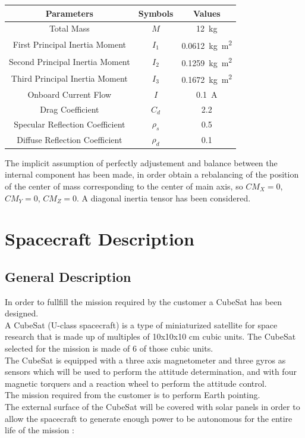 \documentclass[11pt,a4paper]{report}
\begin{document}
\begin{table}[H]
	\centering
	\begin{tabular}{|c|c|c|}
		\hline
		Parameters & Symbols & Values \\
		\hline
		Total Mass & $M$ & \SI{12}{\kilo\gram}\\
        \hline
		First Principal Inertia Moment & $I_1$ & \SI{0.0612}{\kilo\gram\meter^2}\\
		\hline		
		Second Principal Inertia Moment & $I_2$ & \SI{0.1259}{\kilo\gram\meter^2}\\
		\hline
		Third Principal Inertia Moment & $I_3$ & \SI{0.1672}{\kilo\gram\meter^2}\\
		\hline
		Onboard Current Flow & $I$ & \SI{0.1}{\ampere}\\
		\hline
		Drag Coefficient & $C_d$ & 2.2 \\
		\hline
		Specular Reflection Coefficient & $\rho_{s}$ & 0.5 \\
		\hline
		Diffuse Reflection Coefficient & $\rho_{d}$ & 0.1 \\
		\hline
	\end{tabular}
\end{table}

The implicit assumption of perfectly adjustement and balance between the internal component has been made, in order obtain a rebalancing of the position of the center of mass corresponding to the center of main axis, so $CM_{X} = 0$, $CM_{Y} = 0$, $CM_{Z} = 0$.
A diagonal inertia tensor has been considered.\\

\chapter{Spacecraft Description}

\section{General Description}
In order to fullfill the mission required by the customer a CubeSat has been designed. \\
A CubeSat (U-class spacecraft) is a type of miniaturized satellite for space research that is made up of multiples of 10x10x10 cm cubic units. The CubeSat selected for the mission is made of 6 of those cubic units. \\
The CubeSat is equipped with a three axis magnetometer and three gyros as sensors which will be used to perform the attitude determination, and with four magnetic torquers and a reaction wheel to perform the attitude control.\\
The mission required from the customer is to perform Earth pointing.\\
The external surface of the CubeSat will be covered with solar panels in order to allow the spacecraft to generate enough power to be autonomous for the entire life of the mission : 
\end{document}
